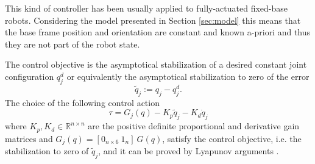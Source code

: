 %
This kind of controller has been usually applied to fully-actuated fixed-base robots.
Considering the model presented in Section \ref{sec:model} this means that the base frame position and orientation are constant and known a-priori and thus they are not part of the robot state.

The control objective is the asymptotical stabilization of a desired constant joint configuration $q_j^d$ or equivalently the asymptotical stabilization to zero of the error
\[\tilde{q}_j := q_j - q_j^d. \]
The choice of the following control action
\begin{equation}\label{eq:pd_plus_grav_law}
    \tau = G_j(q) - K_p \tilde{q}_j - K_d \dot{q}_j
\end{equation}
where $K_p, K_d \in \mathbb{R}^{n\times n}$ are the positive definite proportional and derivative gain matrices and $G_j(q) = [0_{n \times 6}
~1_n]~G(q)$, 
satisfy the control objective, i.e. the stabilization to zero of $\tilde{q}_j$, and it can be proved by Lyapunov arguments \cite[Sec. 6.5.1]{Siciliano2009}.


